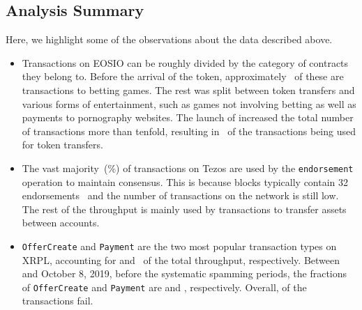 \subsection{Analysis Summary}
Here, we highlight some of the observations about the data described above.
\begin{itemize}\itemsep=0pt
	\item Transactions on EOSIO can be roughly divided by the category of contracts they belong to.
	      Before the arrival of the  token, approximately~ of these are transactions to betting games. The rest was split between token transfers and various forms of entertainment, such as games not involving betting as well as payments to pornography websites. The launch of  increased the total number of transactions more than tenfold, resulting in~ of the transactions being used for token transfers.

	\item The vast majority~(\%) of transactions on Tezos are used by the \texttt{endorsement} operation to maintain consensus. This is because blocks typically contain 32 endorsements~\cite{Tezos2018} and the number of transactions on the network is still low. The rest of the throughput is mainly used by transactions to transfer assets between accounts.

	\item \texttt{OfferCreate} and \texttt{Payment} are the two most popular transaction types on XRPL, accounting for  and~ of the total throughput, respectively. Between \startdate and October 8, 2019, before the systematic spamming periods, the fractions of \texttt{OfferCreate} and \texttt{Payment} are  and , respectively. Overall,  of the transactions fail.
\end{itemize}
